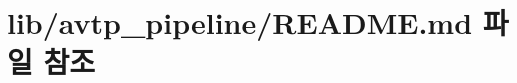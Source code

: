 \hypertarget{lib_2avtp__pipeline_2_r_e_a_d_m_e_8md}{}\section{lib/avtp\+\_\+pipeline/\+R\+E\+A\+D\+ME.md 파일 참조}
\label{lib_2avtp__pipeline_2_r_e_a_d_m_e_8md}

